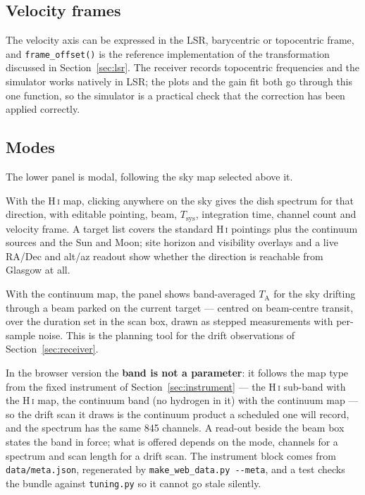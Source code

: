 \documentclass[11pt,a4paper]{article}
\begin{document}
\subsection{Velocity frames}

The velocity axis can be expressed in the LSR, barycentric or topocentric frame, and \texttt{frame\_offset()} is the reference implementation of the transformation discussed in Section~\ref{sec:lsr}. The receiver records topocentric frequencies and the simulator works natively in LSR; the plots and the gain fit both go through this one function, so the simulator is a practical check that the correction has been applied correctly.

\subsection{Modes}

The lower panel is modal, following the sky map selected above it.

\begin{description}[style=nextline]
    \item[H\,\textsc{i} spectrum] With the H\,\textsc{i} map, clicking anywhere on the sky gives the dish spectrum for that direction, with editable pointing, beam, $T_\text{sys}$, integration time, channel count and velocity frame. A target list covers the standard H\,\textsc{i} pointings plus the continuum sources and the Sun and Moon; site horizon and visibility overlays and a live RA/Dec and alt/az readout show whether the direction is reachable from Glasgow at all.
    \item[Continuum drift scan] With the continuum map, the panel shows band-averaged $T_\text{A}$ for the sky drifting through a beam parked on the current target --- centred on beam-centre transit, over the duration set in the scan box, drawn as stepped measurements with per-sample noise. This is the planning tool for the drift observations of Section~\ref{sec:receiver}.
\end{description}

In the browser version the \textbf{band is not a parameter}: it follows the map type from the fixed instrument of Section~\ref{sec:instrument} --- the H\,\textsc{i} sub-band with the H\,\textsc{i} map, the continuum band (no hydrogen in it) with the continuum map --- so the drift scan it draws is the continuum product a scheduled one will record, and the spectrum has the same 845 channels. A read-out beside the beam box states the band in force; what is offered depends on the mode, channels for a spectrum and scan length for a drift scan. The instrument block comes from \texttt{data/meta.json}, regenerated by \texttt{make\_web\_data.py -{}-meta}, and a test checks the bundle against \texttt{tuning.py} so it cannot go stale silently.
\end{document}
